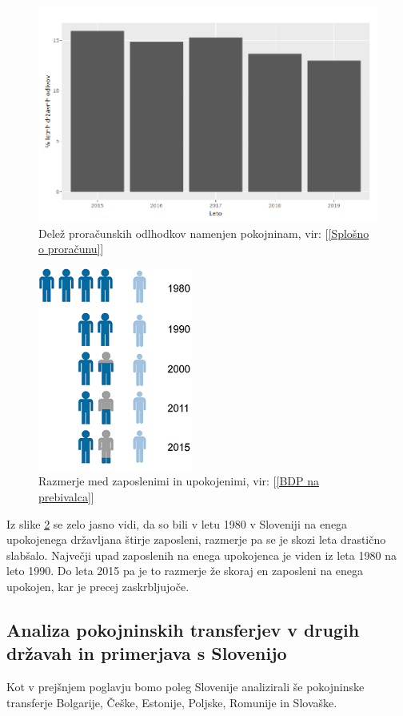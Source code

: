 \documentclass[12pt, a4paper]{article}
\begin{document}
\begin{figure}[t!]
\centering
\includegraphics[height = 7 cm]{pokojnine_procentualno.png}
\caption{Delež proračunskih odlhodkov namenjen pokojninam, vir: [\ref{Splošno o proračunu}]}
\label{Slika 7}
\end{figure}

\begin{figure}[h!]
\centering
\includegraphics[height = 7 cm]{razmerje_med_zaposlenimi_in_upokojenimi_2015.png}
\caption{Razmerje med zaposlenimi in upokojenimi, vir: [\ref{BDP na prebivalca}]}
\label{Slika 8}
\end{figure}

\hspace*{5mm} Iz slike \ref{Slika 8} se zelo jasno vidi, da so bili v letu 1980 v Sloveniji na enega upokojenega državljana štirje zaposleni, razmerje pa se je skozi leta drastično slabšalo. Največji upad zaposlenih na enega upokojenca je viden iz leta 1980 na leto 1990. Do leta 2015 pa je to razmerje že skoraj en zaposleni na enega upokojen, kar je precej zaskrbljujoče.

\newpage

\newpage
\subsection{Analiza pokojninskih transferjev v drugih državah in primerjava s Slovenijo}
\hspace*{5mm} Kot v prejšnjem poglavju bomo poleg Slovenije analizirali še pokojninske transferje Bolgarije, Češke, Estonije, Poljske, Romunije in Slovaške.
\end{document}
